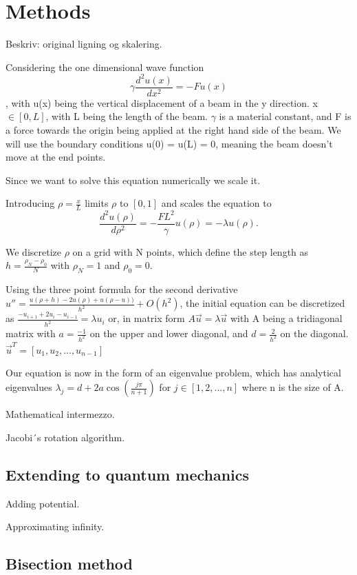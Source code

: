 \section{Methods}


Beskriv:
original ligning og skalering.

Considering the one dimensional wave function
\begin{equation}
\gamma \frac{d^2 u(x)}{dx^2} = -F u(x)
\end{equation}
, with u(x) being the vertical displacement of a beam in the y direction.
x $\in [0, L]$, with L being the length of the beam. $\gamma$ is a material constant,
and F is a force towards the origin being applied at the right hand side of the beam.
We will use the boundary conditions u(0) = u(L) = 0, meaning the beam doesn't move
at the end points.


Since we want to solve this equation numerically we scale it.

Introducing $ \rho = \frac{x}{L} $ limits $\rho$ to $[0, 1]$ and scales the
equation to
$$\frac{d^2 u(\rho)}{d\rho^2} = - \frac{FL^2}{\gamma} u(\rho) = -\lambda u(\rho).$$

We discretize $\rho$ on a grid with N points, which
define the step length as $h = \frac{\rho_N - \rho_0}{N}$ with $\rho_N = 1$ and
$\rho_0 = 0$.

Using the three point formula for the second derivative $ u'' = \frac{u(\rho + h) - 2u(\rho) +
u(\rho -u))}{h^2} + O(h^2)$, the initial equation can be discretized as
$\frac{-u_{i+1} + 2u_i - u_{i-1}}{h^2} = \lambda u_i$
or, in matrix form
$ A \vec{u} = \lambda \vec{u}$
with A being a tridiagonal matrix with $a = \frac{-1}{h^2}$ on the upper and lower
diagonal, and $d = \frac{2}{h^2}$ on the diagonal. $\vec{u}^T = [u_1, u_2, ..., u_{n-1}]$

Our equation is now in the form of an eigenvalue problem, which has analytical
eigenvalues $\lambda_j = d + 2a\cos{(\frac{j\pi}{n+1})}$ for $j \in [1,2,...,n]$
where n is the size of A.

Mathematical intermezzo.


Jacobi´s rotation algorithm.


\subsection{Extending to quantum mechanics}
Adding potential.

Approximating infinity.


\subsection{Bisection method}
